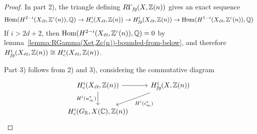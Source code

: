 \documentclass{article}
\numberwithin{equation}{section}
\begin{document}
\begin{lemma}
\begin{proof}
    In part 2), the triangle defining $R\Gamma_\fg (X, \ZZ(n))$ gives an exact
    sequence
    \[ \Hom (H^{2-i} (X_\et, \ZZ^c (n)), \QQ) \to
      H^i_c (X_\et, \ZZ(n)) \to
      H^i_\fg (X_\et, \ZZ(n)) \to
      \Hom (H^{1-i} (X_\et, \ZZ^c (n)), \QQ) \]
    If $i > 2d + 2$, then $\Hom (H^{2-i} (X_\et, \ZZ^c (n)), \QQ) = 0$ by
    lemma~\ref{lemma:RGamma(Xet,Zc(n))-bounded-from-below}, and therefore
    $H^i_\fg (X_\et, \ZZ(n)) \cong H^i_c (X_\et, \ZZ(n))$.

    Part 3) follows from 2) and 3), considering the commutative diagram
    \[ \begin{tikzcd}
        H^i_c (X_\et, \ZZ(n)) \ar{r}\ar{d}[swap]{H^i (u_\infty^*)} & H^i_\fg (X, \ZZ(n))\ar{dl}{H^i (i_\infty^*)} \\
        H^i_c (G_\RR, X (\CC), \ZZ (n))
      \end{tikzcd} \]
  \end{proof}
\end{lemma}
\end{document}
